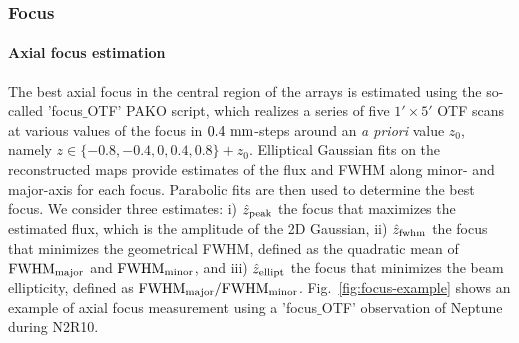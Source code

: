 \subsubsection{Focus}
\label{se:focus}


\paragraph{Axial focus estimation}
\label{sec:focus-meas}

The best axial focus in the central region of the arrays is estimated
using the so-called 'focus$\_$OTF' PAKO script, which realizes a
series of five $1' \times 5'$ OTF scans at various values of
the focus in $0.4~\rm{mm}$-steps around an \emph{a priori} value $z_0$,
namely $z \in \{-0.8, -0.4, 0, 0.4, 0.8\} + z_0$. Elliptical Gaussian
fits on the reconstructed maps provide estimates of the flux and FWHM
along minor- and major-axis for each focus. Parabolic fits are then
used to determine the best focus. We consider three estimates: i)
$\hat z_{\rm{peak}}$ the focus that maximizes the estimated flux,
which is the amplitude of the 2D Gaussian, 
ii) $\hat z_{\rm{fwhm}}$ the focus that
minimizes the geometrical FWHM, defined as the quadratic mean of
$\rm{FWHM}_{\rm{major}}$ and $\rm{FWHM}_{\rm{minor}}$,  and iii)
$\hat z_{\rm{ellipt}}$ the focus that minimizes the beam ellipticity,
defined as $\rm{FWHM}_{\rm{major}}/\rm{FWHM}_{\rm{minor}}$.
Fig.~\ref{fig:focus-example} shows an example of
axial focus measurement using a 'focus$\_$OTF' observation of Neptune
during N2R10.

